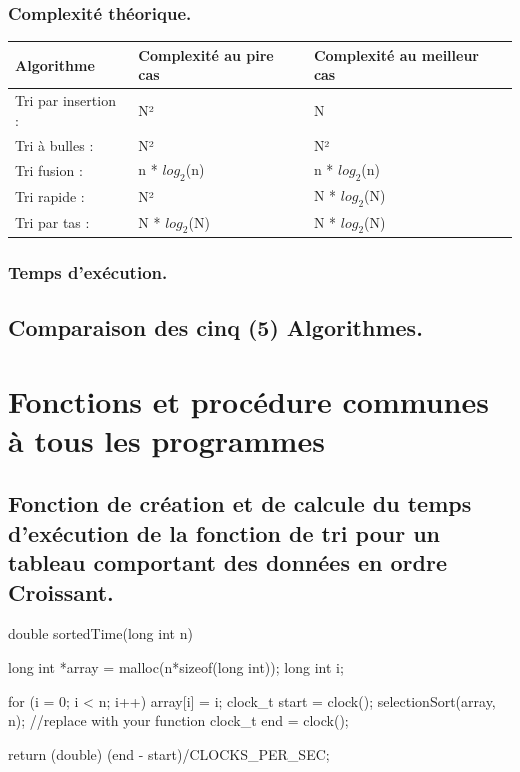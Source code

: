 \documentclass[12pt]{article}
\begin{document}
\subsubsection{Complexité théorique.}
\begin{tabular}{|p{4cm}||p{4cm}|p{4cm}|}
\hline

Algorithme & Complexité au pire cas & Complexité au meilleur cas\\
\hline
Tri par insertion : & N² & N    \\
\hline
Tri à bulles : & N² & N² \\
\hline
Tri fusion :  & n * $log_{2}$(n) & n * $log_{2}$(n) \\
\hline
Tri rapide : & N² & N * $log_{2}$(N) \\
\hline
Tri par tas : & N * $log_{2}$(N) & N * $log_{2}$(N) \\
\hline

\end{tabular}

\subsubsection{Temps d'exécution.}

\subsection{Comparaison des cinq (5) Algorithmes.}










\newpage

\section{Fonctions et procédure communes à tous les programmes}

\subsection{Fonction de création et de calcule du temps d'exécution de la fonction de tri pour un tableau comportant des données en ordre Croissant.}
\begin{sql}
double sortedTime(long int n) {
    
  long int *array = malloc(n*sizeof(long int));
  long int i;
  
  for (i = 0; i < n; i++)
  {
      array[i] = i;
  }
  clock_t start = clock();
  selectionSort(array, n); //replace with your function 
  clock_t end = clock();
  
  return (double) (end - start)/CLOCKS_PER_SEC;
}

\end{sql}
\end{document}
